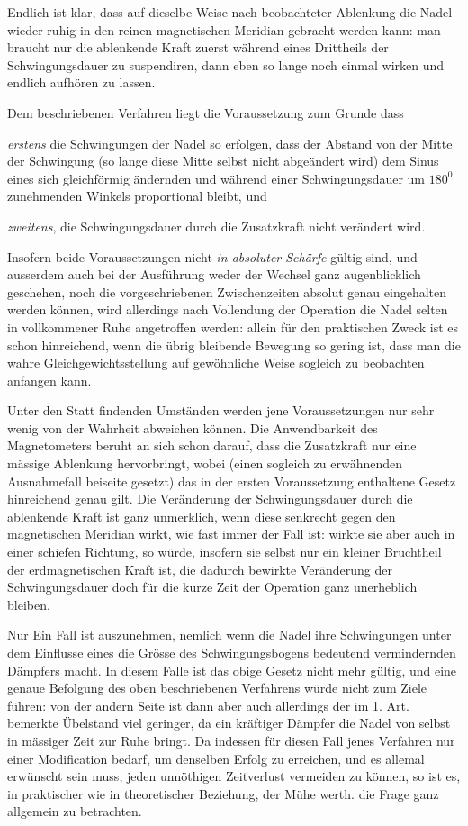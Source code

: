 Endlich ist klar, dass auf dieselbe Weise nach beobachteter Ablenkung die Nadel wieder ruhig in den reinen magnetischen Meridian gebracht werden kann: man braucht nur die ablenkende Kraft zuerst während eines Drittheils der Schwingungsdauer zu suspendiren, dann eben so lange noch einmal wirken und endlich aufhören zu lassen.

Dem beschriebenen Verfahren liegt die Voraussetzung zum Grunde dass

\textit{erstens} die Schwingungen der Nadel so erfolgen, dass der Abstand von der Mitte der Schwingung (so lange diese Mitte selbst nicht abgeändert wird) dem Sinus eines sich gleichförmig ändernden und während einer Schwingungsdauer um $180^0$ zunehmenden Winkels proportional bleibt, und

\textit{zweitens}, die Schwingungsdauer durch die Zusatzkraft nicht verändert wird.

Insofern beide Voraussetzungen nicht \textit{in absoluter Schärfe} gültig sind, und ausserdem auch bei der Ausführung weder der Wechsel ganz augenblicklich geschehen, noch die vorgeschriebenen Zwischenzeiten absolut genau eingehalten werden können, wird allerdings nach Vollendung der Operation die Nadel selten in vollkommener Ruhe angetroffen werden: allein für den praktischen Zweck ist es schon hinreichend, wenn die übrig bleibende Bewegung so gering ist, dass man die wahre Gleichgewichtsstellung auf gewöhnliche Weise sogleich zu beobachten anfangen kann.

Unter den Statt findenden Umständen werden jene Voraussetzungen nur sehr wenig von der Wahrheit abweichen können. Die Anwendbarkeit des Magnetometers beruht an sich schon darauf, dass die Zusatzkraft nur eine mässige Ablenkung hervorbringt, wobei (einen sogleich zu erwähnenden Ausnahmefall beiseite gesetzt) das in der ersten Voraussetzung enthaltene Gesetz hinreichend genau gilt. Die Veränderung der Schwingungsdauer durch die ablenkende Kraft ist ganz unmerklich, wenn diese senkrecht gegen den magnetischen Meridian wirkt, wie fast immer der Fall ist: wirkte sie aber auch in einer schiefen Richtung, so würde, insofern sie selbst nur ein kleiner Bruchtheil der erdmagnetischen Kraft ist, die dadurch bewirkte Veränderung der Schwingungsdauer doch für die kurze Zeit der Operation ganz unerheblich bleiben.

Nur Ein Fall ist auszunehmen, nemlich wenn die Nadel ihre Schwingungen unter dem Einflusse eines die Grösse des Schwingungsbogens bedeutend vermindernden Dämpfers macht. In diesem Falle ist das obige Gesetz nicht mehr gültig, und eine genaue Befolgung des oben beschriebenen Verfahrens würde nicht zum Ziele führen: von der andern Seite ist dann aber auch allerdings der
im 1. Art. bemerkte Übelstand viel geringer, da ein kräftiger Dämpfer die Nadel von selbst in mässiger Zeit zur Ruhe bringt. Da indessen für diesen Fall jenes Verfahren nur einer Modification bedarf, um denselben Erfolg zu erreichen, und es allemal erwünscht sein muss, jeden unnöthigen Zeitverlust vermeiden zu können, so ist es, in praktischer wie in theoretischer Beziehung, der Mühe werth. die Frage ganz allgemein zu betrachten.

